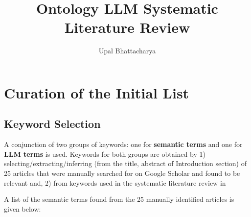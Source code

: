 \documentclass[a4paper,colorinlistoftodos]{article}
\author{Upal Bhattacharya}
\date{}
\title{Ontology LLM Systematic Literature Review}
\begin{document}
\maketitle

\begingroup
    \hypersetup{linkcolor=black}
    \tableofcontents
    \listoftodos
    \pagebreak
\endgroup

\linenumbers

\section{Curation of the Initial List}
\label{sec:initial-list-curation}

\subsection{Keyword Selection}
\label{subsec:keyword-selection}

A conjunction of two groups of keywords: one for \textbf{semantic terms} and
one for \textbf{LLM terms} is used. Keywords for both groups are obtained by
1) selecting/extracting/inferring (from the title, abstract of Introduction
section) of 25 articles that were manually searched for on Google Scholar and
found to be relevant and, 2) from keywords used in the systematic literature
review in \citet{li2025LargeLanguageModels}

A list of the semantic terms found from the 25 manually identified articles is
given below:
\end{document}
